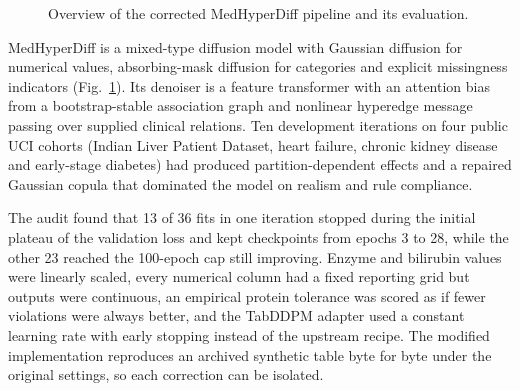 \documentclass[conference]{IEEEtran}
\begin{document}
\begin{figure}[t]
\centering
{}
\caption{Overview of the corrected MedHyperDiff pipeline and its evaluation.}
\label{fig:pipeline}
\end{figure}

MedHyperDiff is a mixed-type diffusion model with Gaussian diffusion for numerical values, absorbing-mask diffusion for categories and explicit missingness indicators (Fig.~\ref{fig:pipeline}). Its denoiser is a feature transformer with an attention bias from a bootstrap-stable association graph and nonlinear hyperedge message passing over supplied clinical relations. Ten development iterations on four public UCI cohorts (Indian Liver Patient Dataset, heart failure, chronic kidney disease and early-stage diabetes) had produced partition-dependent effects and a repaired Gaussian copula that dominated the model on realism and rule compliance.

The audit found that 13 of 36 fits in one iteration stopped during the initial plateau of the validation loss and kept checkpoints from epochs 3 to 28, while the other 23 reached the 100-epoch cap still improving. Enzyme and bilirubin values were linearly scaled, every numerical column had a fixed reporting grid but outputs were continuous, an empirical protein tolerance was scored as if fewer violations were always better, and the TabDDPM adapter used a constant learning rate with early stopping instead of the upstream recipe. The modified implementation reproduces an archived synthetic table byte for byte under the original settings, so each correction can be isolated.
\end{document}
